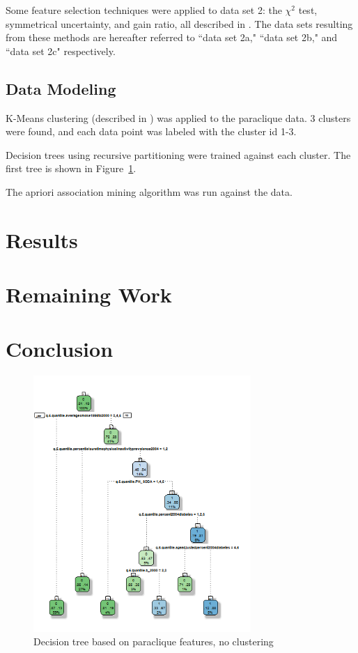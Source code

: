 \documentclass[conference,compsoc]{IEEEtran}
\begin{document}
Some feature selection techniques were applied to data set 2: the ${\chi}^2$ test, symmetrical uncertainty, and gain ratio, all described in \cite{fselector}. The data sets resulting
from these methods are hereafter referred to ``data set 2a," ``data set 2b," and ``data set 2c" respectively.

\subsection{Data Modeling}

K-Means clustering (described in \cite{hartigan}) was applied to the paraclique data. 3 clusters were found, and each data point was labeled with the cluster id 1-3.

Decision trees using recursive partitioning were trained against each cluster. The first tree is shown in Figure~\ref{decision.tree.01}.

The apriori association mining algorithm was run against the data.

\section{Results}

\section{Remaining Work}

\section{Conclusion}

\begin{figure}[!t]
\centering
\includegraphics[width=3.25in]{decision-tree-01-paraclique-no-clustering.png}
\caption{Decision tree based on paraclique features, no clustering}
\label{decision.tree.01}
\end{figure}
\end{document}
